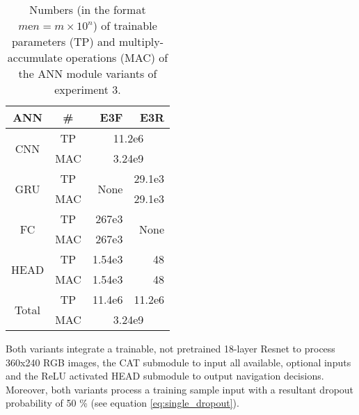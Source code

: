 \providecommand{\ncols}{}\renewcommand{\ncols}{4}
\begin{table}[h]
    \caption[
        Numbers of trainable parameters 
        and multiply-accumulate operations
        of the ANN module variants of experiment 3
    ]{
        Numbers (in the format $m\text{e}n = m\times 10^n$) of trainable parameters (TP)
        and multiply-accumulate operations (MAC)
        of the ANN module variants of experiment 3.
        \label{tab:exp3_nums}}        
    \centering
    \begin{tabular}{|c|c|r|r|} 
        \hline
        ANN
        &\#
        &E3F
        &E3R
        \\\hline
        \multirow{2}{*}{CNN}
        &TP
        &\multicolumn{2}{c|}{11.2e6}
        \\\cline{2-\ncols}
        &MAC
        &\multicolumn{2}{c|}{3.24e9}
        \\\hline
        \multirow{2}{*}{GRU}
        &TP
        &\multirow{2}{*}{None}
        &29.1e3
        \\\cline{2-2}\cline{4-\ncols}
        &MAC
        &
        &29.1e3
        \\\hline
        \multirow{2}{*}{FC}
        &TP
        &267e3
        &\multirow{2}{*}{None}
        \\\cline{2-3}
        &MAC
        &267e3
        &
        \\\hline
        \multirow{2}{*}{HEAD}
        &TP
        &1.54e3
        &48
        \\\cline{2-\ncols}
        &MAC
        &1.54e3
        &48
        \\\hline
        \multirow{2}{*}{Total}
        &TP
        &11.4e6
        &11.2e6
        \\\cline{2-\ncols}
        &MAC
        &\multicolumn{2}{c|}{3.24e9}
        \\\hline
    \end{tabular}
\end{table}

Both variants integrate a trainable,
not pretrained 18-layer Resnet
to process 360x240 RGB images,
the CAT submodule to input 
all available, optional inputs
and the ReLU activated HEAD submodule 
to output navigation decisions.
Moreover, both variants process a training sample 
input with a resultant dropout probability of 
50 \% (see equation \ref{eq:single_dropout}).

